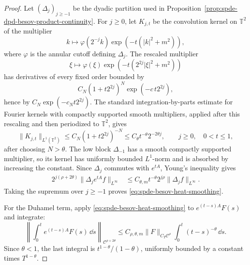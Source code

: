 \begin{proof}
Let \((\Delta_j)_{j\geq-1}\) be the dyadic partition used in
Proposition~\ref{prop:spde-dpd-besov-product-continuity}.  For
\(j\geq0\), let \(K_{j,t}\) be the convolution kernel on \(\mathbb T^2\)
of the multiplier
\[
  k\longmapsto
  \varphi(2^{-j}k)\exp(-t(|k|^2+m^2)),
\]
where \(\varphi\) is the annular cutoff defining \(\Delta_j\).  The
rescaled multiplier
\[
  \xi\longmapsto
  \varphi(\xi)\exp(-t(2^{2j}|\xi|^2+m^2))
\]
has derivatives of every fixed order bounded by
\[
  C_N(1+t2^{2j})^N\exp(-c\,t2^{2j}),
\]
hence by \(C_N\exp(-c_Nt2^{2j})\).  The standard
integration-by-parts estimate for Fourier kernels with compactly supported
smooth multipliers, applied after this rescaling and then periodized to
\(\mathbb T^2\), gives
\[
  \|K_{j,t}\|_{L^1(\mathbb T^2)}
  \leq
  C_N(1+t2^{2j})^{-N}
  \leq
  C_\theta t^{-\theta}2^{-2\theta j},
  \qquad j\geq0,\quad 0<t\leq1,
\]
after choosing \(N>\theta\).  The low block \(\Delta_{-1}\) has a smooth
compactly supported multiplier, so its kernel has uniformly bounded
\(L^1\)-norm and is absorbed by increasing the constant.  Since
\(\Delta_j\) commutes with \(e^{tA}\), Young's inequality gives
\[
\begin{aligned}
  2^{j(\rho+2\theta)}
  \|\Delta_j e^{tA}f\|_{L^\infty}
  &\leq
  C_{\theta,m}t^{-\theta}
  2^{j\rho}\|\Delta_jf\|_{L^\infty}.
\end{aligned}
\]
Taking the supremum over \(j\geq-1\) proves
\eqref{eq:spde-besov-heat-smoothing}.

For the Duhamel term, apply
\eqref{eq:spde-besov-heat-smoothing} to \(e^{(t-s)A}F(s)\) and integrate:
\[
  \left\|
    \int_0^t e^{(t-s)A}F(s)\,\dd s
  \right\|_{\mathcal C^{\rho+2\theta}}
  \leq
  C_{\rho,\theta,m}
  \|F\|_{C_T\mathcal C^\rho}
  \int_0^t(t-s)^{-\theta}\,\dd s .
\]
Since \(\theta<1\), the last integral is
\(t^{1-\theta}/(1-\theta)\), uniformly bounded by a constant times
\(T^{1-\theta}\).
\end{proof}

